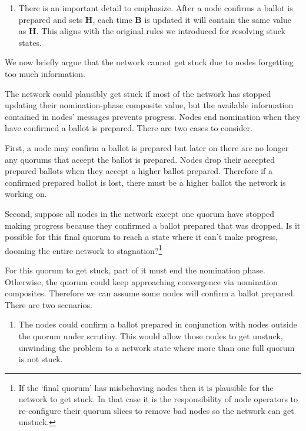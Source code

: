\begin{enumerate}
\begin{enumerate}
        \item There is an important detail to emphasize. After a node confirms a ballot is prepared and sets \textbf{H}, each time \textbf{B} is updated it will contain the same value as \textbf{H}. This aligns with the original rules we introduced for resolving stuck states.
    \end{enumerate}

    We now briefly argue that the network cannot get stuck due to nodes forgetting too much information.

    The network could plausibly get stuck if most of the network has stopped updating their nomination-phase composite value, but the available information contained in nodes' messages prevents progress. Nodes end nomination when they have confirmed a ballot is prepared. There are two cases to consider.
    
    First, a node may confirm a ballot is prepared but later on there are no longer any quorums that accept the ballot is prepared. Nodes drop their accepted prepared ballots when they accept a higher ballot prepared. Therefore if a confirmed prepared ballot is lost, there must be a higher ballot the network is working on.

    Second, suppose all nodes in the network except one quorum have stopped making progress because they confirmed a ballot prepared that was dropped. Is it possible for this final quorum to reach a state where it can't make progress, dooming the entire network to stagnation?\footnote{If the `final quorum' has misbehaving nodes then it is plausible for the network to get stuck. In that case it is the responsibility of node operators to re-configure their quorum slices to remove bad nodes so the network can get unstuck.}
    
    For this quorum to get stuck, part of it must end the nomination phase. Otherwise, the quorum could keep approaching convergence via nomination composites. Therefore we can assume some nodes will confirm a ballot prepared. There are two scenarios.
    \begin{enumerate}
        \item The nodes could confirm a ballot prepared in conjunction with nodes outside the quorum under scrutiny. This would allow those nodes to get unstuck, unwinding the problem to a network state where more than one full quorum is not stuck.%


\end{enumerate}
\end{enumerate}
